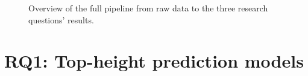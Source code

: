 %
%
\begin{figure}[!htbp]
\centering
{}
\caption{Overview of the full pipeline from raw data to the three research questions' results.}
\label{fig:pipeline-overview}
\end{figure}

\section{RQ1: Top-height prediction models}

